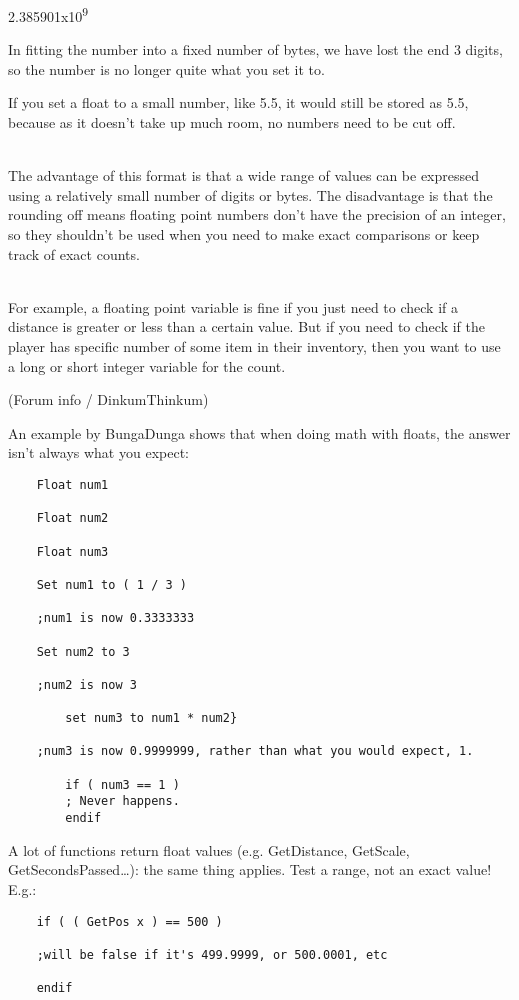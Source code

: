 2.385901x10\textsuperscript{9}

In fitting the number into a fixed number of bytes, we have lost the end
3 digits, so the number is no longer quite what you set it to.

If you set a float to a small number, like 5.5, it would still be stored
as 5.5, because as it doesn't take up much room, no numbers need to be
cut off.\\
\strut \\
The advantage of this format is that a wide range of values can be
expressed using a relatively small number of digits or bytes. The
disadvantage is that the rounding off means floating point numbers don't
have the precision of an integer, so they shouldn't be used when you
need to make exact comparisons or keep track of exact counts.\\
\strut \\
For example, a floating point variable is fine if you just need to check
if a distance is greater or less than a certain value. But if you need
to check if the player has specific number of some item in their
inventory, then you want to use a long or short integer variable for the
count.

(Forum info / DinkumThinkum)

An example by BungaDunga shows that when doing math with floats, the
answer isn't always what you expect:

\begin{lstlisting}
	Float num1
	
	Float num2
	
	Float num3
	
	Set num1 to ( 1 / 3 )
	
	;num1 is now 0.3333333
	
	Set num2 to 3
	
	;num2 is now 3
		
		set num3 to num1 * num2}
	
	;num3 is now 0.9999999, rather than what you would expect, 1.
		
		if ( num3 == 1 )
		; Never happens.
		endif
\end{lstlisting}

A lot of functions return float values (e.g. GetDistance, GetScale,
GetSecondsPassed\ldots): the same thing applies. Test a range, not an
exact value! E.g.:

\begin{lstlisting}
	if ( ( GetPos x ) == 500 )
	
	;will be false if it's 499.9999, or 500.0001, etc
	
	endif
\end{lstlisting}
	

